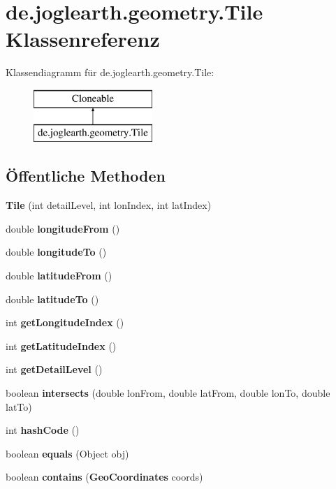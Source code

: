 \section{de.\-joglearth.\-geometry.\-Tile Klassenreferenz}
\label{classde_1_1joglearth_1_1geometry_1_1_tile}
Klassendiagramm für de.\-joglearth.\-geometry.\-Tile\-:\begin{figure}[H]
\begin{center}
\leavevmode
\includegraphics[height=2.000000cm]{classde_1_1joglearth_1_1geometry_1_1_tile}
\end{center}
\end{figure}
\subsection*{Öffentliche Methoden}
\begin{DoxyCompactItemize}
\item 
{\bf Tile} (int detail\-Level, int lon\-Index, int lat\-Index)
\item 
double {\bf longitude\-From} ()
\item 
double {\bf longitude\-To} ()
\item 
double {\bf latitude\-From} ()
\item 
double {\bf latitude\-To} ()
\item 
int {\bf get\-Longitude\-Index} ()
\item 
int {\bf get\-Latitude\-Index} ()
\item 
int {\bf get\-Detail\-Level} ()
\item 
boolean {\bfseries intersects} (double lon\-From, double lat\-From, double lon\-To, double lat\-To)\label{classde_1_1joglearth_1_1geometry_1_1_tile_adfc74c03a286841a64ce0ee042c14434}

\item 
int {\bfseries hash\-Code} ()\label{classde_1_1joglearth_1_1geometry_1_1_tile_a3b21cc339782d60f6063a2400d404818}

\item 
boolean {\bfseries equals} (Object obj)\label{classde_1_1joglearth_1_1geometry_1_1_tile_a3fe21b8a7de2e649e281ad00e97bacaf}

\item 
boolean {\bfseries contains} ({\bf Geo\-Coordinates} coords)\label{classde_1_1joglearth_1_1geometry_1_1_tile_a4f74853fb1566ecc598bdde775b0b691}

\end{DoxyCompactItemize}
